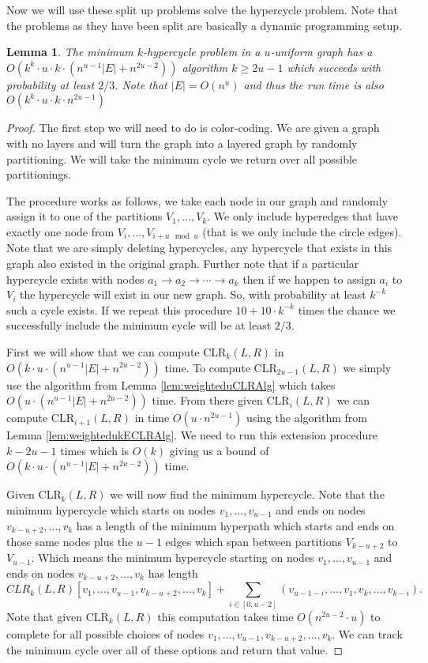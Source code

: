\documentclass[11pt,letterpaper,pdftex]{article}
\newtheorem{lemma}[theorem]{Lemma}
\begin{document}
Now we will use these split up problems solve the hypercycle problem. Note that the problems as they have been split are basically a dynamic programming setup.
\begin{lemma}
    The minimum $k$-hypercycle problem in a $u$-uniform graph has a  $O(k^k \cdot u \cdot k \cdot (n^{u-1}|E| + n^{2u-2}))$ algorithm $k \geq 2u-1$ which succeeds with probability at least $2/3$. Note that $|E| = O(n^u)$ and thus the run time is also $O(k^k \cdot u \cdot k \cdot n^{2u-1})$
    \label{lem:longweightedkhypercyclealg}
\end{lemma}
\begin{proof}
    The first step we will need to do is color-coding. We are given a graph with no layers and will turn the graph into a layered graph by randomly partitioning. We will take the minimum cycle we return over all possible partitionings. 

    The procedure works as follows, we take each node in our graph and randomly assign it to one of the partitions $V_1, \ldots, V_k$. We only include hyperedges that have exactly one node from $V_i, \ldots, V_{i+u \mod u}$ (that is we only include the circle edges). Note that we are simply deleting hypercycles, any hypercycle that exists in this graph also existed in the original graph. Further note that if a particular hypercycle exists with nodes $a_1 \rightarrow a_2 \rightarrow \cdots \rightarrow a_k$ then if we happen to assign $a_i$ to $V_i$ the hypercycle will exist in our new graph. So, with probability at least $k^{-k}$ such a cycle exists. If we repeat this procedure $10 + 10 \cdot k^{-k}$ times the chance we successfully include the minimum cycle will be at least $2/3$.


    First we will show that we can compute CLR$_{k}(L,R)$ in $O(k \cdot u \cdot (n^{u-1}|E| + n^{2u-2}))$ time. To compute CLR$_{2u-1}(L,R)$ we simply use the algorithm from Lemma \ref{lem:weighteduCLRAlg} which takes $O(u \cdot  (n^{u-1}|E| + n^{2u-2}))$ time. From there given CLR$_{i}(L,R)$ we can compute CLR$_{i+1}(L,R)$ in time $O(u \cdot n^{2u-1})$ using the algorithm from Lemma \ref{lem:weightedukECLRAlg}. We need to run this extension procedure $k-2u-1$ times which is $O(k)$ giving us a bound of $O(k \cdot u \cdot (n^{u-1}|E| + n^{2u-2}))$ time. 

    Given CLR$_{k}(L,R)$ we will now find the minimum hypercycle. Note that the minimum hypercycle which starts on nodes $v_1,\ldots, v_{u-1}$ and ends on nodes $v_{k-u+2}, \ldots, v_k$ has a length of the minimum hyperpath which starts and ends on those same nodes plus the $u-1$ edges which span between partitions $V_{k-u+2}$ to $V_{u-1}$. Which means the minimum hypercycle starting on nodes $v_1,\ldots, v_{u-1}$ and ends on nodes $v_{k-u+2}, \ldots, v_k$ has length 
    $$CLR_{k}(L,R)[v_1,\ldots, v_{u-1},v_{k-u+2}, \ldots, v_k] + \sum_{i \in [0,u-2]} (v_{u-1-i}, \ldots, v_{1}, v_{k}, \ldots, v_{k-i}).$$
    Note that given CLR$_{k}(L,R)$ this computation takes time $O(n^{2u-2}\cdot u)$ to complete for all possible choices of nodes $v_1,\ldots, v_{u-1},v_{k-u+2}, \ldots, v_k$. We can track the minimum cycle over all of these options and return that value. 


\end{proof}
\end{document}
